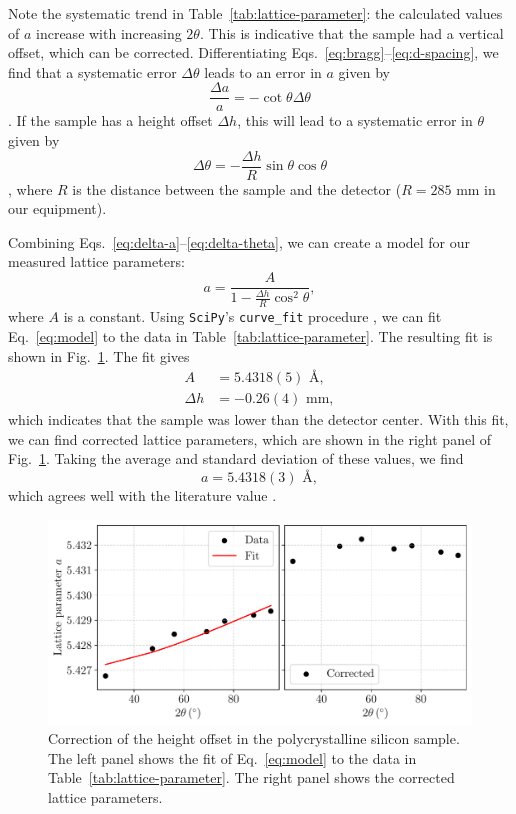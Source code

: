 \documentclass{../paper}
\newcommand{\fig}[1]{Fig.~#1}
\newcommand{\tab}[1]{Table~#1}
\newcommand{\eq}[1]{Eq.~#1}
\newcommand{\eqs}[2]{Eqs.~#1--#2}
\begin{document}
Note the systematic trend in \tab{\ref{tab:lattice-parameter}}: the calculated values of $a$ increase with increasing $2\theta$. This is indicative that the sample had a vertical offset, which can be corrected. Differentiating \eqs{\ref{eq:bragg}}{\ref{eq:d-spacing}}, we find that a systematic error $\Delta\theta$ leads to an error in $a$ given by
\begin{equation}\label{eq:delta-a}
  \frac{\Delta a}{a} = - \cot\theta \Delta\theta
\end{equation}
\cite{Cullity}. If the sample has a height offset $\Delta h$, this will lead to a systematic error in $\theta$ given by
\begin{equation}\label{eq:delta-theta}
  \Delta\theta = - \frac{\Delta h}{R} \sin\theta \cos\theta
\end{equation}
\cite{Cullity}, where $R$ is the distance between the sample and the detector ($R = 285$ mm in our equipment).

Combining \eqs{\ref{eq:delta-a}}{\ref{eq:delta-theta}}, we can create a model for our measured lattice parameters:
\begin{equation}\label{eq:model}
  a = \frac{A}{1 - \frac{\Delta h}{R} \cos^2\theta},
\end{equation}
where $A$ is a constant. Using {\tt SciPy}'s {\tt curve\_fit} procedure \cite{SciPy}, we can fit \eq{\ref{eq:model}} to the data in \tab{\ref{tab:lattice-parameter}}. The resulting fit is shown in \fig{\ref{fig:fit-poly}}. The fit gives
\begin{align}
  A &= 5.4318(5) \text{ \AA}, \\
  \Delta h &= -0.26(4) \text{ mm},
\end{align}
which indicates that the sample was lower than the detector center. With this fit, we can find corrected lattice parameters, which are shown in the right panel of \fig{\ref{fig:fit-poly}}. Taking the average and standard deviation of these values, we find
\begin{equation}
  a = 5.4318(3) \text{ \AA},
\end{equation}
which agrees well with the literature value \cite{Si}.

\begin{figure}
  \centering
  \includegraphics[width=\columnwidth]{analysis/offset_correction.pdf}
  \caption{Correction of the height offset in the polycrystalline silicon sample. The left panel shows the fit of \eq{\ref{eq:model}} to the data in \tab{\ref{tab:lattice-parameter}}. The right panel shows the corrected lattice parameters.}
  \label{fig:fit-poly}
\end{figure}
\end{document}

